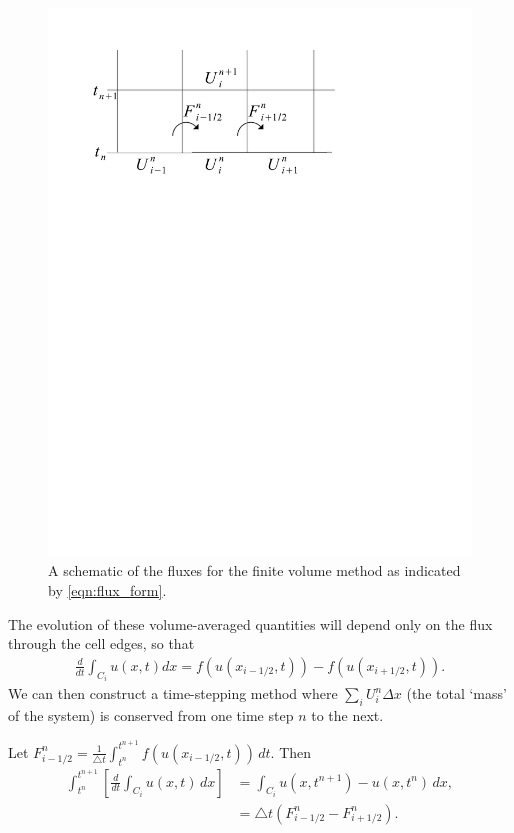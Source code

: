 \begin{figure}
\centering
\includegraphics[trim= 20mm 195mm 0mm 30mm, clip]{flux_form.pdf}
\caption{A schematic of the fluxes for the finite volume method as indicated by \eqref{eqn:flux_form}.}
\end{figure}

The evolution of these volume-averaged quantities will depend only on the flux through the cell edges, so that
\begin{align}
\label{eqn:1D_semi_continuous}
\frac{d}{dt}\int_{C_i} u(x,t) dx = f(u(x_{i-1/2},t))-f(u(x_{i+1/2},t)).
\end{align}
We can then construct a time-stepping method where $\sum_i U_i^n\Delta x$ (the total `mass' of the system) is conserved from one time step $n$ to the next.

Let $F^n_{i-1/2} = \frac{1}{\triangle t}\int_{t^n}^{t^{n+1}} f(u(x_{i-1/2},t)) \, dt$.
Then
\begin{align*}
\int_{t^n}^{t^{n+1}} \left[ \frac{d}{dt}\int_{C_i} u(x,t)\, dx \right]
&{}= \int_{C_i} u(x,t^{n+1}) - u(x,t^{n})\, dx ,\\
&{ }= \triangle t \left(F^n_{i-1/2} - F^n_{i+1/2}\right).
\end{align*}

